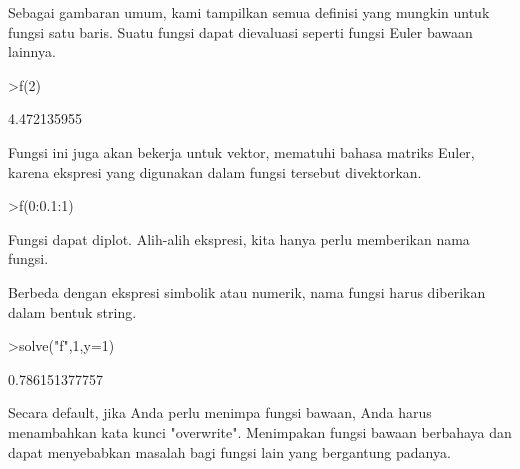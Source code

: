 \documentclass[a4paper,10pt]{article}
\begin{document}
\begin{eulernotebook}
\begin{eulercomment}
\begin{eulercomment}
\begin{eulercomment}
\begin{eulercomment}
\begin{eulercomment}
Sebagai gambaran umum, kami tampilkan semua definisi yang mungkin
untuk fungsi satu baris. Suatu fungsi dapat dievaluasi seperti fungsi
Euler bawaan lainnya.
\end{eulercomment}
\begin{eulerprompt}
>f(2)
\end{eulerprompt}
\begin{euleroutput}
  4.472135955
\end{euleroutput}
\begin{eulercomment}
Fungsi ini juga akan bekerja untuk vektor, mematuhi bahasa matriks
Euler, karena ekspresi yang digunakan dalam fungsi tersebut
divektorkan.
\end{eulercomment}
\begin{eulerprompt}
>f(0:0.1:1)
\end{eulerprompt}
\begin{euleroutput}
  [0,  0.100499,  0.203961,  0.313209,  0.430813,  0.559017,  0.699714,
  0.854459,  1.0245,  1.21083,  1.41421]
\end{euleroutput}
\begin{eulercomment}
Fungsi dapat diplot. Alih-alih ekspresi, kita hanya perlu memberikan
nama fungsi.

Berbeda dengan ekspresi simbolik atau numerik, nama fungsi harus
diberikan dalam bentuk string.
\end{eulercomment}
\begin{eulerprompt}
>solve("f",1,y=1)
\end{eulerprompt}
\begin{euleroutput}
  0.786151377757
\end{euleroutput}
\begin{eulercomment}
Secara default, jika Anda perlu menimpa fungsi bawaan, Anda harus
menambahkan kata kunci "overwrite". Menimpakan fungsi bawaan berbahaya
dan dapat menyebabkan masalah bagi fungsi lain yang bergantung
padanya.


\end{eulercomment}
\end{eulercomment}
\end{eulercomment}
\end{eulercomment}
\end{eulercomment}
\end{eulernotebook}
\end{document}

